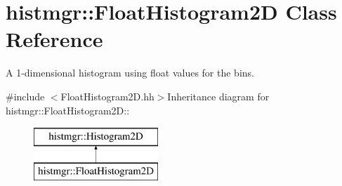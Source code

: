 \section{histmgr::FloatHistogram2D Class Reference}
\label{classhistmgr_1_1FloatHistogram2D}


A 1-\/dimensional histogram using float values for the bins.  


{\ttfamily \#include $<$FloatHistogram2D.hh$>$}Inheritance diagram for histmgr::FloatHistogram2D::\begin{figure}[H]
\begin{center}
\leavevmode
\includegraphics[height=2cm]{classhistmgr_1_1FloatHistogram2D}
\end{center}
\end{figure}
